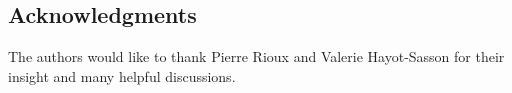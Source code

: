 \documentclass[fleqn,12pt]{SelfArx_ch} %
\begin{document}
\subsection*{Acknowledgments}
The authors would like to thank Pierre Rioux and Valerie Hayot-Sasson for their insight and many helpful discussions.

{\small 


}
\end{document}
